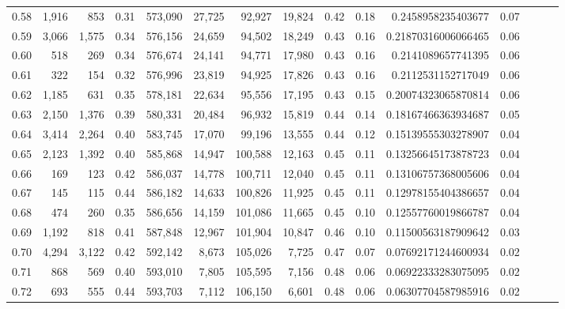\begin{tabular}{rrrrrrrrrrrrrrr}
0.58 &   1,916 &     853 &  0.31 &  573,090 &   27,725 &   92,927 &   19,824 &  0.42 &  0.18 &      0.2458958235403677 &      0.07 \\
0.59 &   3,066 &   1,575 &  0.34 &  576,156 &   24,659 &   94,502 &   18,249 &  0.43 &  0.16 &     0.21870316006066465 &      0.06 \\
0.60 &     518 &     269 &  0.34 &  576,674 &   24,141 &   94,771 &   17,980 &  0.43 &  0.16 &      0.2141089657741395 &      0.06 \\
0.61 &     322 &     154 &  0.32 &  576,996 &   23,819 &   94,925 &   17,826 &  0.43 &  0.16 &      0.2112531152717049 &      0.06 \\
0.62 &   1,185 &     631 &  0.35 &  578,181 &   22,634 &   95,556 &   17,195 &  0.43 &  0.15 &     0.20074323065870814 &      0.06 \\
0.63 &   2,150 &   1,376 &  0.39 &  580,331 &   20,484 &   96,932 &   15,819 &  0.44 &  0.14 &     0.18167466363934687 &      0.05 \\
0.64 &   3,414 &   2,264 &  0.40 &  583,745 &   17,070 &   99,196 &   13,555 &  0.44 &  0.12 &     0.15139555303278907 &      0.04 \\
0.65 &   2,123 &   1,392 &  0.40 &  585,868 &   14,947 &  100,588 &   12,163 &  0.45 &  0.11 &     0.13256645173878723 &      0.04 \\
0.66 &     169 &     123 &  0.42 &  586,037 &   14,778 &  100,711 &   12,040 &  0.45 &  0.11 &     0.13106757368005606 &      0.04 \\
0.67 &     145 &     115 &  0.44 &  586,182 &   14,633 &  100,826 &   11,925 &  0.45 &  0.11 &     0.12978155404386657 &      0.04 \\
0.68 &     474 &     260 &  0.35 &  586,656 &   14,159 &  101,086 &   11,665 &  0.45 &  0.10 &     0.12557760019866787 &      0.04 \\
0.69 &   1,192 &     818 &  0.41 &  587,848 &   12,967 &  101,904 &   10,847 &  0.46 &  0.10 &     0.11500563187909642 &      0.03 \\
0.70 &   4,294 &   3,122 &  0.42 &  592,142 &    8,673 &  105,026 &    7,725 &  0.47 &  0.07 &     0.07692171244600934 &      0.02 \\
0.71 &     868 &     569 &  0.40 &  593,010 &    7,805 &  105,595 &    7,156 &  0.48 &  0.06 &     0.06922333283075095 &      0.02 \\
0.72 &     693 &     555 &  0.44 &  593,703 &    7,112 &  106,150 &    6,601 &  0.48 &  0.06 &     0.06307704587985916 &      0.02 \\

\end{tabular}
